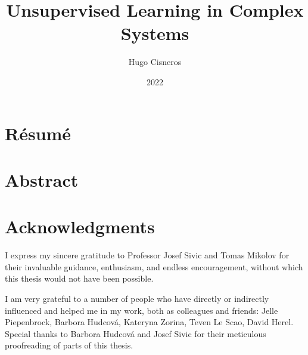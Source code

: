 \documentclass[11pt, twoside, openright]{thesis}
\title{Unsupervised Learning in Complex Systems}
\institute{L'École normale supérieure de Paris}
\author{Hugo Cisneros}
\date{2022}
\begin{document}
\frontmatter
\hypersetup{pageanchor=false}
\maketitle
\hypersetup{pageanchor=true}


\ifprintversion
    \pagestyle{fancy}
    \fancyhead{} %
    \fancyhead[ER,OL]{\footnotesize \rightmark} \fancyhead[EL,OR]{\thepage}
    \fancyfoot{} %
\else
    \pagestyle{fancy}
    \fancyhead{} %
    \fancyhead[R]{\footnotesize \rightmark} \fancyhead[L]{\thepage}
    \fancyfoot{} %
\fi

\cleardoublepage
\chapter*{Résumé}
\thefrabstract{}
\vfill
\thefrkeywords{}
\cleardoublepage
\chapter*{Abstract}
\theenabstract{}
\vfill
\theenkeywords{}

\cleardoublepage
\chapter*{Acknowledgments}

I express my sincere gratitude to Professor Josef Sivic and Tomas Mikolov for
their invaluable guidance, enthusiasm, and endless encouragement, without which
this thesis would not have been possible.

I am very grateful to a number of people who have directly or indirectly
influenced and helped me in my work, both as colleagues and friends: Jelle
Piepenbrock, Barbora Hudcová, Kateryna Zorina, Teven Le Scao, David Herel.
Special thanks to Barbora Hudcová and Josef Sivic for their meticulous
proofreading of parts of this thesis.
\end{document}
